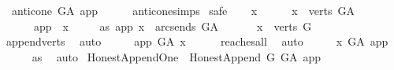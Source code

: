 \begin{isabellebody}
\ \ {\isachardoublequoteopen}anticone\ G{\isacharunderscore}{\kern0pt}A\ app\ {\isacharequal}{\kern0pt}\ {\isacharbraceleft}{\kern0pt}{\isacharbraceright}{\kern0pt}{\isachardoublequoteclose}\isanewline
%
\isadelimproof
\ \ %
\endisadelimproof
%
\isatagproof
{}\isamarkupfalse%
\ anticone{\isachardot}{\kern0pt}simps\isanewline
{}\isamarkupfalse%
\ safe\isanewline
\ \ \isamarkupfalse%
\ x\ \isanewline
\ \ \isamarkupfalse%
\ \ {\isachardoublequoteopen}x\ {\isasymin}\ verts\ G{\isacharunderscore}{\kern0pt}A{\isachardoublequoteclose}\isanewline
\ \ \ \ \ \ {\isachardoublequoteopen}app\ {\isasymnoteq}\ x{\isachardoublequoteclose}\isanewline
\ \ \ \ \ as{\isacharcolon}{\kern0pt}\ {\isachardoublequoteopen}{\isacharparenleft}{\kern0pt}app{\isacharcomma}{\kern0pt}\ x{\isacharparenright}{\kern0pt}\ {\isasymnotin}\ {\isacharparenleft}{\kern0pt}arcs{\isacharunderscore}{\kern0pt}ends\ G{\isacharunderscore}{\kern0pt}A{\isacharparenright}{\kern0pt}\isactrlsup {\isacharplus}{\kern0pt}\ {\isachardoublequoteclose}\isanewline
\ \ \isamarkupfalse%
\ \isamarkupfalse%
\ {\isachardoublequoteopen}x\ {\isasymin}\ verts\ G{\isachardoublequoteclose}\ \isanewline
\ \ \ \ \isamarkupfalse%
\ append{\isacharunderscore}{\kern0pt}verts\ \isamarkupfalse%
\ auto\isanewline
\ \ \isamarkupfalse%
\ \isamarkupfalse%
\ {\isachardoublequoteopen}app\ {\isasymrightarrow}\isactrlsup {\isacharplus}{\kern0pt}\isactrlbsub G{\isacharunderscore}{\kern0pt}A\isactrlesub \ x{\isachardoublequoteclose}\isanewline
\ \ \ \ \isamarkupfalse%
\ reaches{\isacharunderscore}{\kern0pt}all\ \isamarkupfalse%
\ auto\isanewline
\ \ \isamarkupfalse%
\ \isamarkupfalse%
\ {\isachardoublequoteopen}x\ {\isasymrightarrow}\isactrlsup {\isacharplus}{\kern0pt}\isactrlbsub G{\isacharunderscore}{\kern0pt}A\isactrlesub \ app{\isachardoublequoteclose}\ \isanewline
\ \ \ \ \isamarkupfalse%
\ as\ \isamarkupfalse%
\ auto\isanewline
{}\isamarkupfalse%
%
\endisatagproof
{\isafoldproof}%
%
\isadelimproof
\isanewline
%
\endisadelimproof
\isanewline
\isanewline
\isanewline
{}\isamarkupfalse%
\ Honest{\isacharunderscore}{\kern0pt}Append{\isacharunderscore}{\kern0pt}One\ {\isasymsubseteq}\ Honest{\isacharunderscore}{\kern0pt}Append\ G\ G{\isacharunderscore}{\kern0pt}A\ {\isachardoublequoteopen}{\isacharbraceleft}{\kern0pt}app{\isacharbraceright}{\kern0pt}{\isachardoublequoteclose}\ \isanewline

\end{isabellebody}
